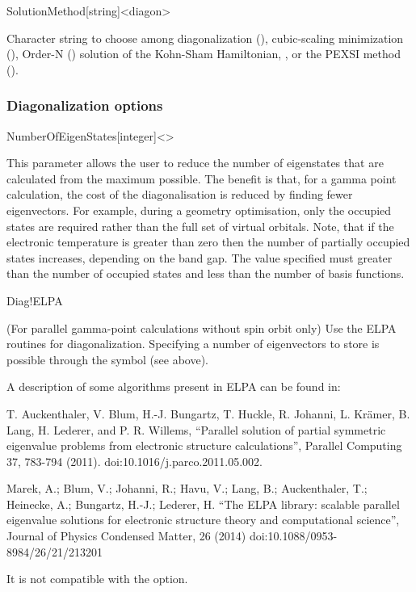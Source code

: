 \begin{fdfentry}{SolutionMethod}[string]<diagon>

  Character string to choose among diagonalization (),
  cubic-scaling minimization (), Order-N ()
  solution of the Kohn-Sham Hamiltonian, , or the
  PEXSI method ().
  
\end{fdfentry}


\subsubsection{Diagonalization options}

\begin{fdfentry}{NumberOfEigenStates}[integer]<>

  This parameter allows the user to reduce the number of eigenstates
  that are calculated from the maximum possible. The benefit is that,
  for a gamma point calculation, the cost of the diagonalisation is
  reduced by finding fewer eigenvectors. For example, during a
  geometry optimisation, only the occupied states are required rather
  than the full set of virtual orbitals. Note, that if the electronic
  temperature is greater than zero then the number of partially
  occupied states increases, depending on the band gap.  The value
  specified must greater than the number of occupied states and less
  than the number of basis functions.
  
\end{fdfentry}

\begin{fdflogicalF}{Diag!ELPA}

  (For parallel gamma-point calculations without spin orbit only) Use
  the ELPA routines for diagonalization.  Specifying a number of
  eigenvectors to store is possible through the symbol
   (see above).

  A description of some algorithms present in ELPA can be found in:

  T. Auckenthaler, V. Blum, H.-J. Bungartz, T. Huckle, R. Johanni,
  L. Kr\"amer, B. Lang, H. Lederer, and P. R. Willems, ``Parallel
  solution of partial symmetric eigenvalue problems from electronic
  structure calculations'', Parallel Computing 37, 783-794 (2011).
  doi:10.1016/j.parco.2011.05.002.

  Marek, A.; Blum, V.; Johanni, R.; Havu, V.; Lang, B.; Auckenthaler,
  T.; Heinecke, A.; Bungartz, H.-J.; Lederer, H.  ``The ELPA library:
  scalable parallel eigenvalue solutions for electronic structure
  theory and computational science'', Journal of Physics Condensed
  Matter, 26 (2014) doi:10.1088/0953-8984/26/21/213201

  \note It is not compatible with the 
  option.
  
\end{fdflogicalF}

